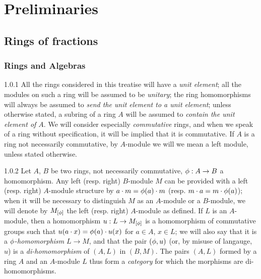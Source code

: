 \setcounter{chapter}{-1}
\chapter{Preliminaries}
\label{0-prelim}

\section{Rings of fractions}
\label{0-prelim-1}

\setcounter{subsection}{-1}
\subsection{Rings and Algebras}
\label{0-prelim-1.0}

\begin{env}{1.0.1}
\label{env-0.1.0.1}
All the rings considered in this treatise will have a \emph{unit element}; all the modules
on such a ring will be assumed to be \emph{unitary}; the ring homomorphisms will always be
assumed to \emph{send the unit element to a unit element}; unless otherwise stated,
a subring of a ring $A$ will be assumed to \emph{contain the unit element of $A$}. We will
consider especially \emph{commutative} rings, and when we speak of a ring without
specification, it will be implied that it is commutative. If $A$ is a ring not necessarily
commutative, by $A$-module we will we mean a left module, unless stated otherwise.
\end{env}

\begin{env}{1.0.2}
\label{env-0.1.0.2}
Let $A$, $B$ be two rings, not necessarily commutative, $\phi:A\to B$ a homomorphism.
Any left (resp. right) $B$-module $M$ can be provided with a left (resp. right) $A$-module
structure by $a\cdot m=\phi(a)\cdot m$ (resp. $m\cdot a=m\cdot\phi(a)$); when it will
be necessary to distinguish $M$ as an $A$-module or a $B$-module, we will denote by
$M_{[\phi]}$ the left (resp. right) $A$-module as defined. If $L$ is an $A$-module, then
a homomorphism $u:L\to M_{[\phi]}$ is a homomorphism of commutative groups such that
$u(a\cdot x)=\phi(a)\cdot u(x)$ for $a\in A$, $x\in L$; we will also say that it is a
$\phi$-\emph{homomorphism} $L\to M$, and that the pair $(\phi,u)$ (or, by misuse of
langauge, $u$) is a \emph{di-homomorphism} of $(A,L)$ in $(B,M)$. The pairs $(A,L)$ formed by
a ring $A$ and an $A$-module $L$ thus form a \emph{category} for which the morphisms are
di-homomorphisms.
\end{env}

